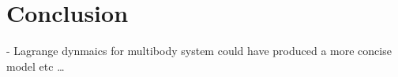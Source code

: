 \chapter{Conclusion}
\label{ch:conclusion}
- Lagrange dynmaics for multibody system could have produced a more concise model etc \ldots
